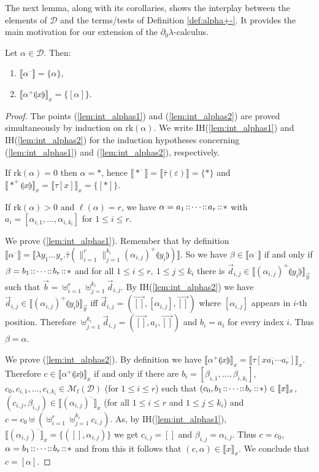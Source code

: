 \documentclass{LMCS}
\newcommand{\dzlam}{\ensuremath{\partial_0\lambda}}
\newcommand{\lam}{\ensuremath{\lambda}}
\renewcommand{\hole}[1]{\llparenthesis #1\rrparenthesis}
\newcommand{\rank}{\mathrm{rk}}
\newcommand{\len}{\ell}
\newcommand{\Int}[1]{\llbracket #1\rrbracket} \newcommand{\trm}[1]{#1^{\textrm{--}}}
\newcommand{\cont}[2]{#1^{+}\hole{#2}}
\newcommand{\Mfin}[1]{\mathcal{M}_{\mathrm{f}}(#1)}
\newcommand{\mcup}{\uplus}
\newcommand{\seq}[1]{\vec{#1}}
\newcommand{\gt}{\ensuremath{\tau}}
\newcommand{\gto}{\ensuremath{\bar\tau}}
\newcommand{\cD}{\mathcal{D}}
\begin{document}
The next lemma, along with its corollaries, shows the interplay between the 
elements of $\cD$ and the terms/tests of Definition \ref{def:alpha+-}.
It provides  the main motivation for our  extension
of the \dzlam-calculus.

\begin{lem}\label{lem:int_alphas} Let $\alpha\in \cD$. Then:
\begin{enumerate}[\em(i)]
\item\label{lem:int_alphas1} 
	$\Int{\trm{\alpha}}= \{ \alpha \}$,
\item\label{lem:int_alphas2} 
	$\Int{\cont{\alpha}{x}}_{x} = \{[\alpha]\}$.
\end{enumerate}
\end{lem}

\begin{proof} 
The points (\ref{lem:int_alphas1}) and (\ref{lem:int_alphas2}) are 
proved simultaneously by induction on $\rank(\alpha)$.
We write IH(\ref{lem:int_alphas1}) and IH(\ref{lem:int_alphas2}) 
for the induction hypotheses concerning (\ref{lem:int_alphas1}) and (\ref{lem:int_alphas2}), respectively. 

If $\rank(\alpha) = 0$ then $\alpha=*$, hence $\Int{\trm{*}} = \Int{\gto(\varepsilon)} = \{*\}$ and $\Int{\cont{*}{x}}_{x} =\Int{\gt[x]}_{x} = \{[*]\}$.


If $\rank(\alpha)> 0$ and $\len(\alpha) = r$, we have $\alpha = a_1 \!::\! \cdots\!::\! a_r\!::\! *$
with $a_i = [\alpha_{i,1},\ldots,\alpha_{i,k_i}]$ for $1\le i\le r$.

We prove  (\ref{lem:int_alphas1}). Remember that by definition  
$\Int{\trm{\alpha}} = \Int{\lam y_1\ldots y_r.\gto(\parallel_{i = 1}^r 
\parallel_{j= 1}^{k_i} \cont{(\alpha_{i,j})}{y_i})}$.
So we have  $\beta\in \Int{\trm{\alpha}}$ if and only if 
$\beta = b_1\!::\!\cdots\!::\! b_r\!::\! *$ and for all $1\le i \le r,\ 1\le j\le k_i$ there is 
$\seq{d}_{i,j}\in\Int{\cont{(\alpha_{i,j})}{y_i}}_{\seq y}$ such that 
$\seq b = \mcup_{i =1}^r \mcup_{j =1}^{k_i}
\seq d_{i,j}$.
By IH(\ref{lem:int_alphas2}) we have $\seq d_{i,j}\in\Int{\cont{(\alpha_{i,j})}{y_i}}_{\seq y}$ 
iff $\seq d_{i,j} = (\seq{[]},[\alpha_{i,j}],\seq{[]})$ 
where $[\alpha_{i,j}]$ appears in $i$-th position.
Therefore $\mcup_{j =1}^{k_i} \seq d_{i,j}=(\seq{[]},a_i,\seq{[]})$ and
$b_i = a_i$ for every index $i$. Thus $\beta = \alpha$.

We prove (\ref{lem:int_alphas2}). By definition we have $\Int{\cont{\alpha}{x}}_{x} = \Int{\gt[x\trm{a_1}\cdots\trm{a_r}]}_{x}$.
Therefore $ c\in\Int{\cont{\alpha}{x}}_{x}$ if and only if there are 
$b_i = [\beta_{i,1},\ldots,\beta_{i,k_i}]$,
$ c_0, c_{i,1},\ldots, c_{i,k_i}\in\Mfin{\cD}$ (for $1\le i \le r$)
such that $( c_0,b_1\at\cdots\at b_{r}\at *)\in\Int{x}_{x}$, 
$( c_{i,j}, \beta_{i,j}) \in\Int{\trm{(\alpha_{i,j})}}_{x}$ (for all $1\le i\le r$ and $1\le j\le k_i$) and 
$ c =  c_0\mcup (\mcup_{i =1}^{r} \mcup_{j =1}^{k_i} c_{i,j})$.
As, by IH(\ref{lem:int_alphas1}), $\Int{\trm{(\alpha_{i,j})}}_{ x} = \{ ({[]},\alpha_{i,j})\}$ we get 
$c_{i,j} =  []$ and $\beta_{i,j} = \alpha_{i,j}$. 
Thus $ c =  c_0$, $\alpha = b_1\!::\!\cdots\!::\! b_r\!::\! *$ and from this it follows that $( c,\alpha)\in\Int{x}_{ x}$.
We conclude that $c=[\alpha]$.
\end{proof}
\end{document}
